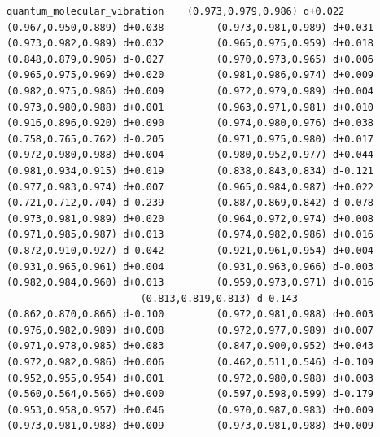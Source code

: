 \documentclass[11pt, letterpaper, openany]{book}
\begin{document}
\begin{empiricalbox}
\begin{lstlisting}[style=terminal]
quantum_molecular_vibration    (0.973,0.979,0.986) d+0.022         (0.967,0.950,0.889) d+0.038         (0.973,0.981,0.989) d+0.031         (0.973,0.982,0.989) d+0.032         (0.965,0.975,0.959) d+0.018         (0.848,0.879,0.906) d-0.027         (0.970,0.973,0.965) d+0.006         (0.965,0.975,0.969) d+0.020         (0.981,0.986,0.974) d+0.009         (0.982,0.975,0.986) d+0.009         (0.972,0.979,0.989) d+0.004         (0.973,0.980,0.988) d+0.001         (0.963,0.971,0.981) d+0.010         (0.916,0.896,0.920) d+0.090         (0.974,0.980,0.976) d+0.038         (0.758,0.765,0.762) d-0.205         (0.971,0.975,0.980) d+0.017         (0.972,0.980,0.988) d+0.004         (0.980,0.952,0.977) d+0.044         (0.981,0.934,0.915) d+0.019         (0.838,0.843,0.834) d-0.121         (0.977,0.983,0.974) d+0.007         (0.965,0.984,0.987) d+0.022         (0.721,0.712,0.704) d-0.239         (0.887,0.869,0.842) d-0.078         (0.973,0.981,0.989) d+0.020         (0.964,0.972,0.974) d+0.008         (0.971,0.985,0.987) d+0.013         (0.974,0.982,0.986) d+0.016         (0.872,0.910,0.927) d-0.042         (0.921,0.961,0.954) d+0.004         (0.931,0.965,0.961) d+0.004         (0.931,0.963,0.966) d-0.003         (0.982,0.984,0.960) d+0.013         (0.959,0.973,0.971) d+0.016                      -                      (0.813,0.819,0.813) d-0.143         (0.862,0.870,0.866) d-0.100         (0.972,0.981,0.988) d+0.003         (0.976,0.982,0.989) d+0.008         (0.972,0.977,0.989) d+0.007         (0.971,0.978,0.985) d+0.083         (0.847,0.900,0.952) d+0.043         (0.972,0.982,0.986) d+0.006         (0.462,0.511,0.546) d-0.109         (0.952,0.955,0.954) d+0.001         (0.972,0.980,0.988) d+0.003         (0.560,0.564,0.566) d+0.000         (0.597,0.598,0.599) d-0.179         (0.953,0.958,0.957) d+0.046         (0.970,0.987,0.983) d+0.009         (0.973,0.981,0.988) d+0.009         (0.973,0.981,0.988) d+0.009     

\end{lstlisting}
\end{empiricalbox}
\end{document}

